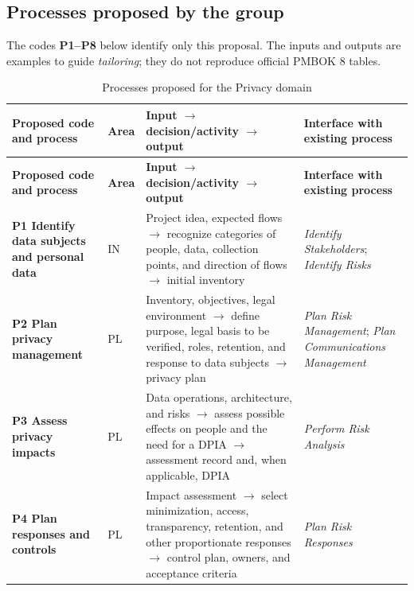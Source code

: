 \documentclass[11pt,a4paper]{article}
\newcommand{\SingleSpacing}{}
\begin{document}
\subsection{Processes proposed by the group}

The codes \textbf{P1–P8} below identify only this proposal. The inputs and outputs are examples to guide \textit{tailoring}; they do not reproduce official PMBOK 8 tables.

\begingroup\SingleSpacing\footnotesize
\begin{longtable}{@{}>{\raggedright\arraybackslash}p{}>{\raggedright\arraybackslash}p{}>{\raggedright\arraybackslash}p{}>{\raggedright\arraybackslash}p{}@{}}
\caption{Processes proposed for the Privacy domain}\label{tab:t3}\\
\toprule
\textbf{Proposed code and process} & \textbf{Area} & \textbf{Input \ensuremath{\rightarrow} decision/activity \ensuremath{\rightarrow} output} & \textbf{Interface with existing process}\\
\midrule
\endfirsthead
\toprule
\textbf{Proposed code and process} & \textbf{Area} & \textbf{Input \ensuremath{\rightarrow} decision/activity \ensuremath{\rightarrow} output} & \textbf{Interface with existing process}\\
\midrule
\endhead
\bottomrule
\endfoot
\bottomrule
\endlastfoot
\textbf{P1 Identify data subjects and personal data} & IN & Project idea, expected flows \ensuremath{\rightarrow} recognize categories of people, data, collection points, and direction of flows \ensuremath{\rightarrow} initial inventory & \textit{Identify Stakeholders}; \textit{Identify Risks}\\[3pt]
\textbf{P2 Plan privacy management} & PL & Inventory, objectives, legal environment \ensuremath{\rightarrow} define purpose, legal basis to be verified, roles, retention, and response to data subjects \ensuremath{\rightarrow} privacy plan & \textit{Plan Risk Management}; \textit{Plan Communications Management}\\[3pt]
\textbf{P3 Assess privacy impacts} & PL & Data operations, architecture, and risks \ensuremath{\rightarrow} assess possible effects on people and the need for a DPIA \ensuremath{\rightarrow} assessment record and, when applicable, DPIA & \textit{Perform Risk Analysis}\\[3pt]
\textbf{P4 Plan responses and controls} & PL & Impact assessment \ensuremath{\rightarrow} select minimization, access, transparency, retention, and other proportionate responses \ensuremath{\rightarrow} control plan, owners, and acceptance criteria & \textit{Plan Risk Responses}\\[3pt]

\end{longtable}
\end{document}
